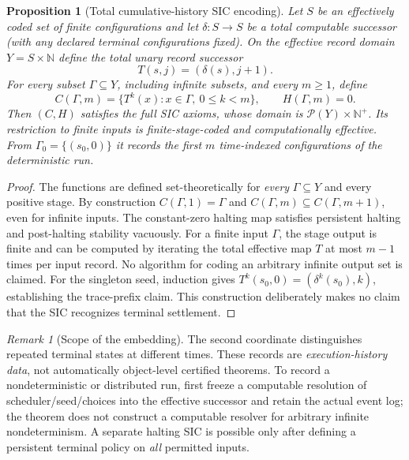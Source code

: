 \documentclass[10pt,letterpaper]{article}
\newtheorem{proposition}[definition]{Proposition}
\theoremstyle{remark}\newtheorem{remark}[definition]{Remark}
\newcommand{\N}{\mathbb{N}}
\begin{document}
\begin{proposition}[Total cumulative-history SIC encoding]
Let $S$ be an effectively coded set of finite configurations and let $\delta:S\to S$ be a total computable successor (with any declared terminal configurations fixed). On the effective record domain $Y=S\times\N$ define the total unary record successor
\[
T(s,j)=(\delta(s),j+1).
\]
For \emph{every} subset $\Gamma\subseteq Y$, including infinite subsets, and every $m\ge1$, define
\[
C(\Gamma,m)=\{T^k(x):x\in\Gamma,\ 0\le k<m\},\qquad H(\Gamma,m)=0.
\]
Then $(C,H)$ satisfies the full SIC axioms, whose domain is $\mathcal P(Y)\times\N^+$. Its restriction to \emph{finite} inputs is finite-stage-coded and computationally effective. From $\Gamma_0=\{(s_0,0)\}$ it records the first $m$ time-indexed configurations of the deterministic run.
\end{proposition}
\begin{proof}
The functions are defined set-theoretically for \emph{every} $\Gamma\subseteq Y$ and every positive stage. By construction $C(\Gamma,1)=\Gamma$ and $C(\Gamma,m)\subseteq C(\Gamma,m+1)$, even for infinite inputs. The constant-zero halting map satisfies persistent halting and post-halting stability vacuously. For a finite input $\Gamma$, the stage output is finite and can be computed by iterating the total effective map $T$ at most $m-1$ times per input record. No algorithm for coding an arbitrary infinite output set is claimed. For the singleton seed, induction gives $T^k(s_0,0)=(\delta^k(s_0),k)$, establishing the trace-prefix claim. This construction deliberately makes no claim that the SIC recognizes terminal settlement.
\end{proof}
\begin{remark}[Scope of the embedding]
The second coordinate distinguishes repeated terminal states at different times. These records are \emph{execution-history data}, not automatically object-level certified theorems. To record a nondeterministic or distributed run, first freeze a computable resolution of scheduler/seed/choices into the effective successor and retain the actual event log; the theorem does not construct a computable resolver for arbitrary infinite nondeterminism. A separate halting SIC is possible only after defining a persistent terminal policy on \emph{all} permitted inputs.
\end{remark}
\end{document}
